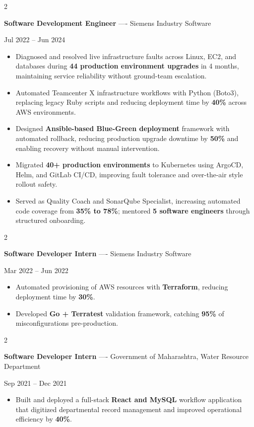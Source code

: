 \documentclass[10pt, letterpaper]{article}
\newenvironment{highlights}{
    \begin{itemize}[
        topsep=0.10 cm,
        parsep=0.06 cm,
        partopsep=0pt,
        itemsep=0.06 cm,
        leftmargin=12pt
    ]
}{
    \end{itemize}
}
\newenvironment{twocolentry}[2][]{
    \onecolentry
    \def\secondColumn{#2}
    \setcolumnwidth{\fill, 4.5 cm}
    \begin{paracol}{2}
}{
    \switchcolumn \raggedleft \secondColumn
    \end{paracol}
    \endonecolentry
}
\begin{document}
\vspace{0.15 cm}

\begin{twocolentry}{Jul 2022 -- Jun 2024}
\textbf{Software Development Engineer} ---- Siemens Industry Software
\end{twocolentry}
\begin{highlights}
  \item Diagnosed and resolved live infrastructure faults across Linux, EC2, and databases during \textbf{44 production environment upgrades} in 4 months, maintaining service reliability without ground-team escalation.
  \item Automated Teamcenter X infrastructure workflows with Python (Boto3), replacing legacy Ruby scripts and reducing deployment time by \textbf{40\%} across AWS environments.
  \item Designed \textbf{Ansible-based Blue-Green deployment} framework with automated rollback, reducing production upgrade downtime by \textbf{50\%} and enabling recovery without manual intervention.
  \item Migrated \textbf{40+ production environments} to Kubernetes using ArgoCD, Helm, and GitLab CI/CD, improving fault tolerance and over-the-air style rollout safety.
  \item Served as Quality Coach and SonarQube Specialist, increasing automated code coverage from \textbf{35\% to 78\%}; mentored \textbf{5 software engineers} through structured onboarding.
\end{highlights}

\vspace{0.15 cm}

\begin{twocolentry}{Mar 2022 -- Jun 2022}
\textbf{Software Developer Intern} ---- Siemens Industry Software
\end{twocolentry}
\begin{highlights}
  \item Automated provisioning of AWS resources with \textbf{Terraform}, reducing deployment time by \textbf{30\%}.
  \item Developed \textbf{Go + Terratest} validation framework, catching \textbf{95\%} of misconfigurations pre-production.
\end{highlights}

\vspace{0.15 cm}

\begin{twocolentry}{Sep 2021 -- Dec 2021}
\textbf{Software Developer Intern} ---- Government of Maharashtra, Water Resource Department
\end{twocolentry}
\begin{highlights}
  \item Built and deployed a full-stack \textbf{React and MySQL} workflow application that digitized departmental record management and improved operational efficiency by \textbf{40\%}.
\end{highlights}
\end{document}
